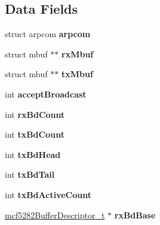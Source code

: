 \subsection*{Data Fields}
\begin{DoxyCompactItemize}
\item 
\mbox{\label{structmcf5282__enet__struct_a8adfac7cb936af249b3c971e5184036c}} 
struct arpcom {\bfseries arpcom}
\item 
\mbox{\label{structmcf5282__enet__struct_a65901431469f1e51224be41d35b0a9a0}} 
struct mbuf $\ast$$\ast$ {\bfseries rx\+Mbuf}
\item 
\mbox{\label{structmcf5282__enet__struct_aa19bd42910c025f1ba39827dbf4f59cb}} 
struct mbuf $\ast$$\ast$ {\bfseries tx\+Mbuf}
\item 
\mbox{\label{structmcf5282__enet__struct_a52c89e207c2d8bcc89fcd9e049260187}} 
int {\bfseries accept\+Broadcast}
\item 
\mbox{\label{structmcf5282__enet__struct_a9e29e09001f5b5228cd503afa210e33c}} 
int {\bfseries rx\+Bd\+Count}
\item 
\mbox{\label{structmcf5282__enet__struct_ae5f609ec6c38be461963a2d881a040f1}} 
int {\bfseries tx\+Bd\+Count}
\item 
\mbox{\label{structmcf5282__enet__struct_a7e4bac6347710f279f2570dfa1a45a00}} 
int {\bfseries tx\+Bd\+Head}
\item 
\mbox{\label{structmcf5282__enet__struct_a3f22a6c31ad687872a3cd990c4ef4e17}} 
int {\bfseries tx\+Bd\+Tail}
\item 
\mbox{\label{structmcf5282__enet__struct_abc9f137807757296135382c17e5941b8}} 
int {\bfseries tx\+Bd\+Active\+Count}
\item 
\mbox{\label{structmcf5282__enet__struct_aea7aa3ef06b90c960e00b42decc378a0}} 
\mbox{\hyperlink{structmcf5282BufferDescriptor__}{mcf5282\+Buffer\+Descriptor\+\_\+t}} $\ast$ {\bfseries rx\+Bd\+Base}

\end{DoxyCompactItemize}
